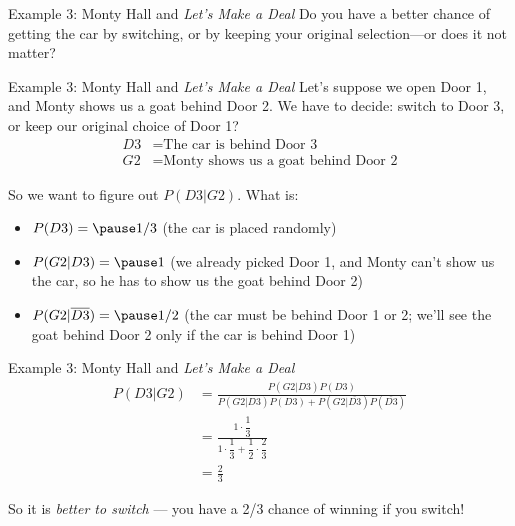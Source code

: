 \documentclass{beamer}\usepackage[]{graphicx}\usepackage[]{color}
\begin{document}
\begin{darkframes}
\begin{frame}{Example 3: Monty Hall and \emph{Let's Make a Deal}}
  Do you have a better chance of getting the car by switching, or by keeping your original selection---or does it not matter?
  \lc
\end{frame}

\begin{frame}{Example 3: Monty Hall and \emph{Let's Make a Deal}}
  Let's suppose we open Door 1, and Monty shows us a goat behind Door 2. We have to decide: switch to Door 3, or keep our original choice of Door 1?
  \begin{align*}
    D3 &= \text{The car is behind Door 3} \\
    G2 &= \text{Monty shows us a goat behind Door 2}
  \end{align*}

  So we want to figure out $P(D3|G2)$. What is:
  \begin{itemize}[<+->]
    \item $P(D3) = \pause 1/3$ (the car is placed randomly)
    \item $P(G2|D3) = \pause 1$ (we already picked Door 1, and Monty can't show us the car, so he has to show us the goat behind Door 2)
    \item $P(G2|\overline{D3}) = \pause 1/2$ (the car must be behind Door 1 or 2; we'll see the goat behind Door 2 only if the car is behind Door 1)
  \end{itemize}
\end{frame}

\begin{frame}{Example 3: Monty Hall and \emph{Let's Make a Deal}}
  \begin{align*}
    P(D3|G2) &= \frac{ P(G2|D3)P(D3) }{ P(G2|D3)P(D3) + P(G2|\overline{D3})P(\overline{D3}) } \\
    &= \frac{ 1 \cdot \dfrac 1 3 }{ 1 \cdot \dfrac 1 3 + \dfrac 1 2 \cdot \dfrac 2 3 } \\
    &= \frac 2 3
  \end{align*}
  \pause

  So it is \emph{better to switch} --- you have a 2/3 chance of winning if you switch!
\end{frame}

\end{darkframes}
\end{document}
